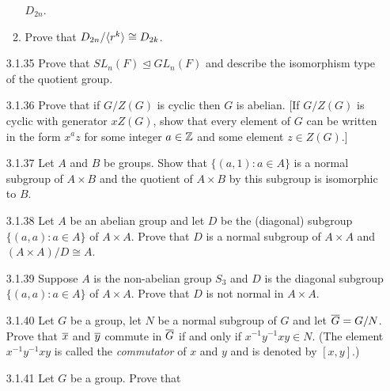\begin{enumerate}
\begin{enumerate}
                           $D_{2n}$.
                     \item Prove that $D_{2n}/\langle r^k \rangle \cong D_{2k}$.
                  \end{enumerate}
   \item[3.1.35]  Prove that $SL_n(F) \trianglelefteq GL_n(F)$ and describe the
                  isomorphism type of the quotient group.
   \item[3.1.36]  Prove that if $G/Z(G)$ is cyclic then $G$ is abelian. [If
                  $G/Z(G)$ is cyclic with generator $xZ(G)$, show that every
                  element of $G$ can be written in the form $x^az$ for some
                  integer $a \in \mathbb{Z}$ and some element $z \in Z(G)$.]
   \item[3.1.37]  Let $A$ and $B$ be groups. Show that $\{(a, 1) : a \in A\}$ is
                  a normal subgroup of $A \times B$ and the quotient of
                  $A \times B$ by this subgroup is isomorphic to $B$.
   \item[3.1.38]  Let $A$ be an abelian group and let $D$ be the (diagonal)
                  subgroup $\{(a, a) : a \in A\}$ of $A \times A$. Prove that
                  $D$ is a normal subgroup of $A \times A$ and
                  $(A \times A)/D \cong A$.
   \item[3.1.39]  Suppose $A$ is the non-abelian group $S_3$ and $D$ is the
                  diagonal subgroup $\{(a, a) : a \in A\}$ of $A \times A$.
                  Prove that $D$ is not normal in $A \times A$.
   \item[3.1.40]  Let $G$ be a group, let $N$ be a normal subgroup of $G$ and
                  let $\overline{G} = G/N$. Prove that $\overline{x}$ and $\overline{y}$ commute in
                  $\overline{G}$ if and only if $x^{-1}y^{-1}xy \in N$. (The element
                  $x^{-1}y^{-1}xy$ is called the \textit{commutator} of $x$ and
                  $y$ and is denoted by $[x, y]$.)
   \item[3.1.41]  Let $G$ be a group. Prove that

\end{enumerate}
